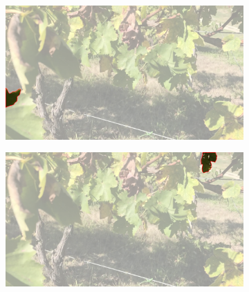 \documentclass[runningheads]{llncs}
\begin{document}

\begin{figure}[h!]
\centering
\begin{subfigure}[b]{.33\linewidth}
\includegraphics[width=\linewidth]{imgs/18_over_healthy_033_cam3.png}
\caption{}
\label{fig:sam1a}
\end{subfigure}
\begin{subfigure}[b]{.33\linewidth}
\includegraphics[width=\linewidth]{imgs/19_over_healthy_033_cam3.png}
\caption{}
\label{fig:sam1b}
\end{subfigure}%


\end{figure}
\end{document}
